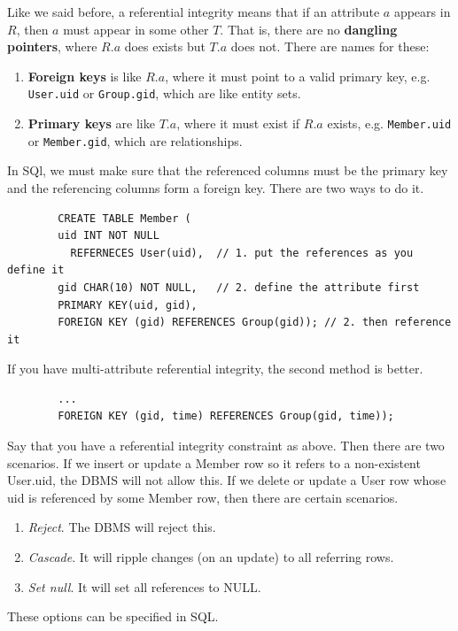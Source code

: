     \begin{definition}
      Like we said before, a referential integrity means that if an attribute $a$ appears in $R$, then $a$ must appear in some other $T$. That is, there are no \textbf{dangling pointers}, where $R.a$ does exists but $T.a$ does not. There are names for these: 
      \begin{enumerate}
        \item \textbf{Foreign keys} is like $R.a$, where it must point to a valid primary key, e.g. \texttt{User.uid} or \texttt{Group.gid}, which are like entity sets. 
        \item \textbf{Primary keys} are like $T.a$, where it must exist if $R.a$ exists, e.g. \texttt{Member.uid} or \texttt{Member.gid}, which are relationships. 
      \end{enumerate}
      In SQl, we must make sure that the referenced columns must be the primary key and the referencing columns form a foreign key. There are two ways to do it. 
      \begin{lstlisting}
        CREATE TABLE Member (
        uid INT NOT NULL 
          REFERNECES User(uid),  // 1. put the references as you define it
        gid CHAR(10) NOT NULL,   // 2. define the attribute first
        PRIMARY KEY(uid, gid), 
        FOREIGN KEY (gid) REFERENCES Group(gid)); // 2. then reference it
      \end{lstlisting}
      If you have multi-attribute referential integrity, the second method is better. 
      \begin{lstlisting}
        ...
        FOREIGN KEY (gid, time) REFERENCES Group(gid, time)); 
      \end{lstlisting}
    \end{definition}

    \begin{example}
      Say that you have a referential integrity constraint as above. Then there are two scenarios. If we insert or update a Member row so it refers to a non-existent User.uid, the DBMS will not allow this. If we delete or update a User row whose uid is referenced by some Member row, then there are certain scenarios. 
      \begin{enumerate}
        \item \textit{Reject}. The DBMS will reject this. 
        \item \textit{Cascade}. It will ripple changes (on an update) to all referring rows. 
        \item \textit{Set null}. It will set all references to NULL. 
      \end{enumerate}
      These options can be specified in SQL. 
    \end{example}

